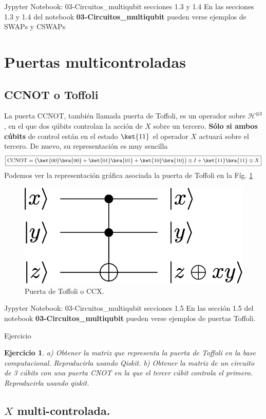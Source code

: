 \documentclass[a4paper,11pt]{book} %
\newtheorem{ejercicio_contador}{Ejercicio}
\newcommand{\Ejercicio}[1]{
		\begin{mybox_gray}{Ejercicio} 
			\begin{ejercicio_contador}
				 #1 
			\end{ejercicio_contador} 
		\end{mybox_gray}
	}
\numberwithin{equation}{chapter}
\begin{document}
	\begin{mybox_orange}{Jypyter Notebook: 03-Circuitos\_multiqubit secciones 1.3 y 1.4}
	En las secciones 1.3 y 1.4 del notebook \textbf{03-Circuitos\_multiqubit} pueden verse ejemplos de SWAPs y CSWAPs
	\end{mybox_orange}

    \section{Puertas multicontroladas}
		\subsection{CCNOT o Toffoli}
		
La puerta CCNOT, también llamada puerta de Toffoli,  es un operador sobre $\mathcal{H}^{\otimes 3}$, en el que dos qúbits controlan la acción de $X$ sobre un tercero. \textbf{Sólo si ambos cúbits} de control están en el estado $\ket{11}$ el operador $X$ actuará sobre el tercero. De nuevo, su representación es muy sencilla
	\begin{equation}
	\boxed{{\rm CCNOT} = \big(\ket{00}\bra{00}+\ket{01}\bra{01}+\ket{10}\bra{10}\big)\otimes I + \ket{11}\bra{11}\otimes X}
	\end{equation}
Podemos ver la representación gráfica asociada la puerta de Toffoli en la Fíg. \ref{Fig_multiqubit_ccX_gate}
	\begin{figure}[H]
	\centering 
	\includegraphics[width=0.22\linewidth]{Figuras/Fig_multiqubit_ccX_gate}
	\caption{Puerta de Toffoli o CCX.}
	\label{Fig_multiqubit_ccX_gate}
	\end{figure}
	
	\begin{mybox_orange}{Jypyter Notebook: 03-Circuitos\_multiqubit secciones 1.5}
	En las sección 1.5 del notebook \textbf{03-Circuitos\_multiqubit} pueden verse ejemplos de puertas Toffoli.
	\end{mybox_orange}

	\Ejercicio{a) Obtener la matriz que representa la puerta de Toffoli en la base computacional. Reproducirla usando Qiskit. b) Obtener la matriz de un circuito de 3 cúbits con una puerta CNOT en la que el tercer cúbit controla el primero. Reproducirla usando qiskit.}
	
		\subsection{$X$ multi-controlada.}
		
\end{document}
